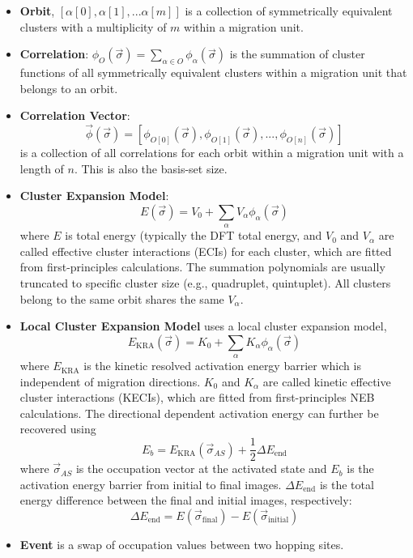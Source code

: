 \documentclass[a4paper,fleqn]{cas-dc}
\begin{document}
\begin{itemize}
    \item \textbf{Orbit}, $[\alpha[0],\alpha[1],...\alpha[m]]$ is a collection of symmetrically equivalent clusters with a multiplicity of $m$ within a migration unit.

    \item \textbf{Correlation}: $\phi_{O}(\vec{\sigma})=\sum_{\alpha\in O}\phi_{\alpha}(\vec{\sigma})$ is the summation of cluster functions of all symmetrically equivalent clusters within a migration unit that belongs to an orbit.
    
    \item \textbf{Correlation Vector}:
    \begin{equation}
    \vec{\phi}(\vec{\sigma})=[\phi_{O[0]}(\vec{\sigma}),\phi_{O[1]}(\vec{\sigma}),...,\phi_{O[n]}(\vec{\sigma})]
    \end{equation} is a collection of all correlations for each orbit within a migration unit with a length of $n$. This is also the basis-set size.

    \item \textbf{Cluster Expansion Model}: 
    \begin{equation}
        E(\vec{\sigma})=V_0+\sum_{\alpha} V_{\alpha} \phi_{\alpha}(\vec{\sigma})
    \end{equation} 
    where $E$ is total energy (typically the DFT total energy,  and $V_0$ and $V_{\alpha}$ are called effective cluster interactions (ECIs) for each cluster, which are fitted from first-principles calculations. The summation polynomials are usually truncated to specific cluster size (e.g., quadruplet, quintuplet). All  clusters belong to the same orbit shares the same $V_{\alpha}$.
    
    \item \textbf{Local Cluster Expansion Model} uses a local  cluster expansion model,
    \begin{equation}
        E_\mathrm{KRA}(\vec{\sigma})=K_0+\sum_{\alpha} K_{\alpha} \phi_{\alpha}(\vec{\sigma})
        \label{eq:CE}
    \end{equation}
    where $E_\mathrm{KRA}$ is  the kinetic resolved activation energy barrier which is independent of migration directions. $K_0$ and $K_{\alpha}$ are called kinetic effective cluster interactions (KECIs), which are fitted from first-principles NEB calculations. The directional dependent activation energy can further be recovered using 
    \begin{equation}
    E_{b} = E_\mathrm{KRA}(\vec{\sigma}_{AS}) + \frac{1}{2}\Delta E_\mathrm{end}
    \end{equation}
    where $\vec{\sigma}_{AS}$ is the occupation vector at the activated state and $E_b$ is the activation energy barrier from initial to final images. $\Delta E_\mathrm{end}$ is the total energy difference between the final and initial images, respectively:
    \begin{equation}
        \Delta E_\mathrm{end} =E(\vec{\sigma}_\mathrm{final}) - E(\vec{\sigma}_\mathrm{initial})
    \end{equation}
    \item \textbf{Event} is a swap of occupation values between two hopping sites.
    

\end{itemize}
\end{document}

